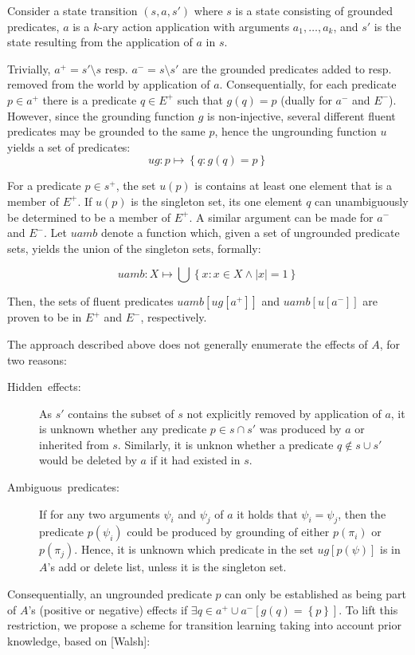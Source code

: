 \documentclass[../master.tex]{subfiles}
\begin{document}
    Consider a state transition $\left(s,a,s'\right)$ where $s$ is a
state consisting of grounded predicates, $a$ is a $k$-ary action
application with arguments $a_{1},\dots,a_{k}$, and $s'$ is the
state resulting from the application of $a$ in $s$.

Trivially, $a^{+}=s'\setminus s$ resp. $a^{-}=s\setminus s'$ are
the grounded predicates added to resp. removed from the world by application
of $a$. Consequentially, for each predicate $p\in a^{+}$ there is
a predicate $q\in E^{+}$ such that $g\left(q\right)=p$ (dually for
$a^{-}$ and $E^{-}$). However, since the grounding function $g$
is non-injective, several different fluent predicates may be grounded
to the same $p$, hence the ungrounding function $u$ yields a set
of predicates:
\[
ug:p\mapsto\left\{ q:g\left(q\right)=p\right\}
\]


For a predicate $p\in s^{+}$, the set $u\left(p\right)$ is contains
at least one element that is a member of $E^{+}$. If $u\left(p\right)$
is the singleton set, its one element $q$ can unambiguously be determined
to be a member of $E^{+}$. A similar argument can be made for $a^{-}$
and $E^{-}$. Let $uamb$ denote a function which, given a set of
ungrounded predicate sets, yields the union of the singleton sets,
formally:

\[
uamb:X\mapsto\bigcup\left\{ x:x\in X\land\left|x\right|=1\right\}
\]


Then, the sets of fluent predicates $uamb\left[ug\left[a^{+}\right]\right]$
and $uamb\left[u\left[a^{-}\right]\right]$ are proven to be in $E^{+}$
and $E^{-}$, respectively.

The approach described above does not generally enumerate the effects
of $A$, for two reasons:
\begin{description}
\item [{Hidden\ effects:}] As $s'$ contains the subset of $s$ not explicitly
removed by application of $a$, it is unknown whether any predicate
$p\in s\cap s'$ was produced by $a$ or inherited from $s$. Similarly,
it is unknon whether a predicate $q\notin s\cup s'$ would be deleted
by $a$ if it had existed in $s$.
\item [{Ambiguous\ predicates:}] If for any two arguments $\psi_{i}$
and $\psi_{j}$ of $a$ it holds that $\psi_{i}=\psi_{j}$, then the
predicate $p\left(\psi_{i}\right)$ could be produced by grounding
of either $p\left(\pi_{i}\right)$ or $p\left(\pi_{j}\right)$. Hence,
it is unknown which predicate in the set $ug\left[p\left(\psi\right)\right]$
is in $A$'s add or delete list, unless it is the singleton set.
\end{description}
Consequentially, an ungrounded predicate $p$ can only be established
as being part of $A$'s (positive or negative) effects if $\exists q\in a^{+}\cup a^{-}\left[g\left(q\right)=\left\{ p\right\} \right]$.
To lift this restriction, we propose a scheme for transition learning
taking into account prior knowledge, based on {[}Walsh{]}:
\end{document}
